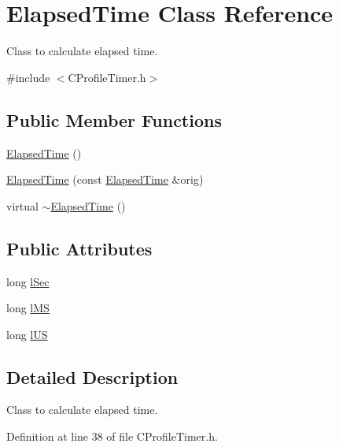 \hypertarget{class_elapsed_time}{\section{\-Elapsed\-Time \-Class \-Reference}
\label{class_elapsed_time}
}


\-Class to calculate elapsed time.  




{\ttfamily \#include $<$\-C\-Profile\-Timer.\-h$>$}

\subsection*{\-Public \-Member \-Functions}
\begin{DoxyCompactItemize}
\item 
\hyperlink{class_elapsed_time_a0d4dee8e0a29671f90ad255bca524138}{\-Elapsed\-Time} ()
\item 
\hyperlink{class_elapsed_time_a7e583630ca148540fa30913ec1e9b902}{\-Elapsed\-Time} (const \hyperlink{class_elapsed_time}{\-Elapsed\-Time} \&orig)
\item 
virtual \hyperlink{class_elapsed_time_a1caf02ccdce17e1abe16bb52c99e7520}{$\sim$\-Elapsed\-Time} ()
\end{DoxyCompactItemize}
\subsection*{\-Public \-Attributes}
\begin{DoxyCompactItemize}
\item 
long \hyperlink{class_elapsed_time_aedb8e2089f81dbec5475d4ac2f4f25dd}{l\-Sec}
\item 
long \hyperlink{class_elapsed_time_a2b76a2dc61d0d0937e5d08e4b4866320}{l\-M\-S}
\item 
long \hyperlink{class_elapsed_time_a4160942c7eb69634b8e6fa5b32c7f047}{l\-U\-S}
\end{DoxyCompactItemize}


\subsection{\-Detailed \-Description}
\-Class to calculate elapsed time. 

\-Definition at line 38 of file \-C\-Profile\-Timer.\-h.



